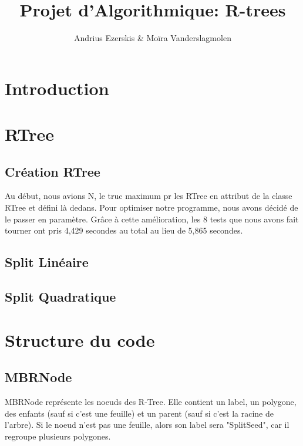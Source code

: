 \documentclass[utf8]{article}
\begin{document}
\begin{titlepage}


  \author{Andrius Ezerskis \& Moïra Vanderslagmolen}
  \title{Projet d'Algorithmique: R-trees}

  \maketitle
\end{titlepage}
\tableofcontents
\newpage
\begin{large}



  \section{Introduction}
  \indent
  \par


  \par
  \section{RTree}
  \subsection{Création RTree}
  \par
  \indent
  Au début, nous avions N, le truc maximum pr les RTree en attribut de la classe RTree et défini là dedans.
  Pour optimiser notre programme, nous avons décidé de le passer en paramètre.
  Grâce à cette amélioration, les 8 tests que nous avons fait tourner ont pris
  4,429 secondes au total au lieu de 5,865 secondes.

  \subsection{Split Linéaire}

  \subsection{Split Quadratique}



  \section{Structure du code}

  \par
  \subsection{MBRNode}
  \par
  \indent
  MBRNode représente les noeuds des R-Tree. Elle contient un label, un polygone,
  des enfants (sauf si c'est une feuille) et un parent (sauf si c'est la racine de
  l'arbre). Si le noeud n'est pas une feuille, alors son label sera "SplitSeed",
  car il regroupe plusieurs polygones.


\end{large}
\end{document}

